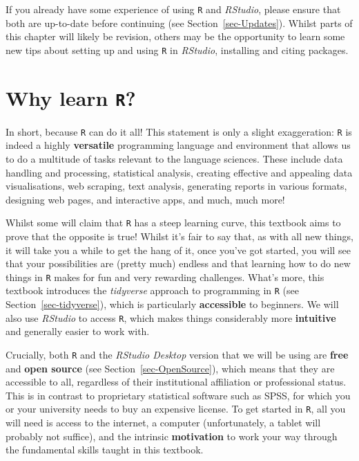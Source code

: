 \documentclass[
  letterpaper,
  DIV=11,
  numbers=noendperiod]{scrreprt}
\begin{document}
If you already have some experience of using \texttt{R} and
\emph{RStudio}, please ensure that both are up-to-date before continuing
(see Section~\ref{sec-Updates}). Whilst parts of this chapter will
likely be revision, others may be the opportunity to learn some new tips
about setting up and using \texttt{R} in \emph{RStudio}, installing and
citing packages.

\section{\texorpdfstring{Why learn
\texttt{R}?}{Why learn R?}}\label{why-learn-r}

In short, because \texttt{R} can do it all! This statement is only a
slight exaggeration: \texttt{R} is indeed a highly \textbf{versatile}
programming language and environment that allows us to do a multitude of
tasks relevant to the language sciences. These include data handling and
processing, statistical analysis, creating effective and appealing data
visualisations, web scraping, text analysis, generating reports in
various formats, designing web pages, and interactive apps, and much,
much more! 

Whilst some will claim that \texttt{R} has a steep learning curve, this
textbook aims to prove that the opposite is true! Whilst it's fair to
say that, as with all new things, it will take you a while to get the
hang of it, once you've got started, you will see that your
possibilities are (pretty much) endless and that learning how to do new
things in \texttt{R} makes for fun and very rewarding challenges. What's
more, this textbook introduces the \emph{tidyverse} approach to
programming in \texttt{R} (see Section~\ref{sec-tidyverse}), which is
particularly \textbf{accessible} to beginners. We will also use
\emph{RStudio} to access \texttt{R}, which makes things considerably
more \textbf{intuitive} and generally easier to work with.

Crucially, both \texttt{R} and the \emph{RStudio Desktop} version that
we will be using are \textbf{free} and \textbf{open source} (see
Section~\ref{sec-OpenSource}), which means that they are accessible to
all, regardless of their institutional affiliation or professional
status. This is in contrast to proprietary statistical software such as
SPSS, for which you or your university needs to buy an expensive
license. To get started in \texttt{R}, all you will need is access to
the internet, a computer (unfortunately, a tablet will probably not
suffice), and the intrinsic \textbf{motivation} to work your way through
the fundamental skills taught in this textbook.
\end{document}
